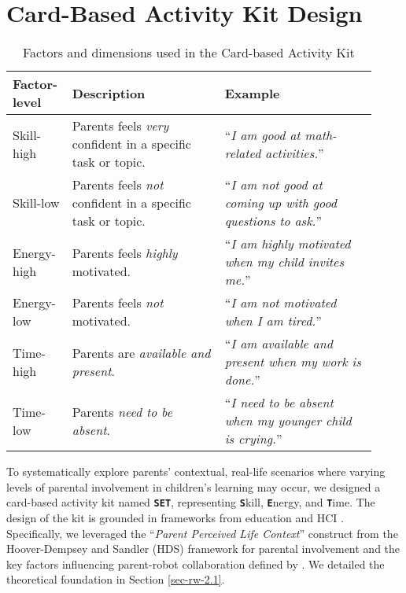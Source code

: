 \section{Card-Based Activity Kit Design} \label{sec-card}

\begin{table*}[!t]
    \caption{Factors and dimensions used in the Card-based Activity Kit}
    \label{tab:kit-example}
    \centering
    \small
    \begin{tabular}{p{0.12\linewidth}p{0.4\linewidth}p{0.4\linewidth}}%
        \toprule
         \textbf{Factor-level} & \textbf{Description} & \textbf{Example} \\
        \midrule
         Skill-high & Parents feels \textit{very} confident in a specific task or topic. & ``\textit{I am good at math-related activities.}'' \\
         \midrule
         Skill-low & Parents feels \textit{not} confident in a specific task or topic. & ``\textit{I am not good at coming up with good questions to ask.}'' \\
         \midrule
         Energy-high & Parents feels \textit{highly} motivated. & ``\textit{I am highly motivated when my child invites me.}'' \\
         \midrule
         Energy-low & Parents feels \textit{not} motivated. & ``\textit{I am not motivated when I am tired.}'' \\
         \midrule
         Time-high & Parents are \textit{available and present}. & ``\textit{I am available and present when my work is done.}'' \\
         \midrule
         Time-low & Parents \textit{need to be absent}. & ``\textit{I need to be absent when my younger child is crying.}'' \\     
         \bottomrule
    \end{tabular}
\end{table*}

To systematically explore parents' contextual, real-life scenarios where varying levels of parental involvement in children's learning may occur, we designed a card-based activity kit named \textbf{\texttt{SET}}, representing \textbf{\texttt{S}}kill, \textbf{\texttt{E}}nergy, and \textbf{\texttt{T}}ime. The design of the kit is grounded in frameworks from education \cite{green2007parents} and HCI \cite{ho2024s}. Specifically, we leveraged the ``\textit{Parent Perceived Life Context}'' construct from the Hoover-Dempsey and Sandler (HDS) framework for parental involvement \cite{green2007parents} and the key factors influencing parent-robot collaboration defined by \citet{ho2024s}. We detailed the theoretical foundation in Section \ref{sec-rw-2.1}.

